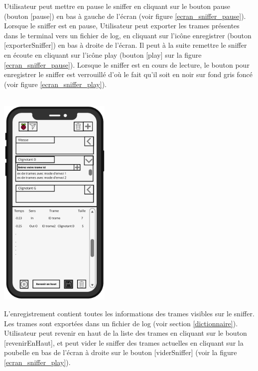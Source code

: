 \newpage
Utilisateur peut mettre en pause le sniffer en cliquant sur le bouton pause (bouton [pause]) en bas à gauche de l'écran (voir figure \ref{ecran_sniffer_pause}). Lorsque le sniffer est en pause, Utilisateur peut exporter les trames présentes dans le terminal vers un fichier de log, en cliquant sur l'icône {\guillemetleft} enregistrer {\guillemetright} (bouton [exporterSniffer]) en bas à droite de l'écran. 
Il peut à la suite remettre le sniffer en écoute en cliquant sur l'icône play (bouton [play] sur la figure \ref{ecran_sniffer_pause}). Lorsque le sniffer est en cours de lecture, le bouton pour enregistrer le sniffer est verrouillé d'où le fait qu'il soit en noir sur fond gris foncé (voir figure \ref{ecran_sniffer_play}). 
\\\\
\begin{minipage}{1\linewidth}
    \centering
    \includegraphics[width=0.4\textwidth]{sections/3_Exigences_specifiques/1_IHM/ihm/ecranSnifferPlay.png}
    \captionsetup{justification=centering}
    \label{ecran_sniffer_play}
\end{minipage}\hfill

\vspace{0.5cm}

L'enregistrement contient toutes les informations des trames visibles sur le sniffer. Les trames sont exportées dans un fichier de log (voir section \ref{dictionnaire}).\newline \\
Utilisateur peut revenir en haut de la liste des trames en cliquant sur le bouton [revenirEnHaut], et peut vider le sniffer des trames actuelles en cliquant sur la poubelle en bas de l'écran à droite sur le bouton [viderSniffer] (voir la figure \ref{ecran_sniffer_play}). 
\newpage